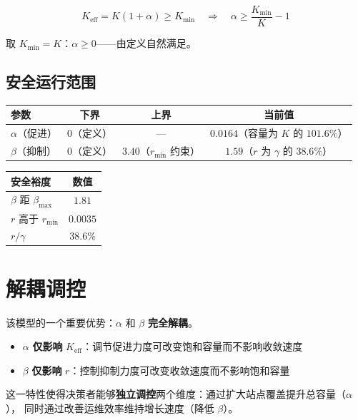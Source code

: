 \documentclass[12pt,a4paper]{article}
\begin{document}
\begin{equation}
K_{\text{eff}} = K(1+\alpha) \geq K_{\min} \quad\Rightarrow\quad
\alpha \geq \frac{K_{\min}}{K} - 1
\end{equation}

取 $K_{\min} = K$：$\alpha \geq 0$——由定义自然满足。

\subsection{安全运行范围}

\begin{center}
\begin{tabular}{lccc}
\toprule
参数 & 下界 & 上界 & 当前值 \\
\midrule
$\alpha$（促进） & $0$（定义） & — & $0.0164$（容量为 $K$ 的 $101.6\%$）\\
$\beta$（抑制） & $0$（定义） & $3.40$（$r_{\min}$ 约束） & $1.59$（$r$ 为 $\gamma$ 的 $38.6\%$）\\
\bottomrule
\end{tabular}
\end{center}

\begin{center}
\begin{tabular}{lc}
\toprule
安全裕度 & 数值 \\
\midrule
$\beta$ 距 $\beta_{\max}$ & $1.81$ \\
$r$ 高于 $r_{\min}$ & $0.0035$ \\
$r/\gamma$ & $38.6\%$ \\
\bottomrule
\end{tabular}
\end{center}

\section{解耦调控}

该模型的一个重要优势：$\alpha$ 和 $\beta$ \textbf{完全解耦}。

\begin{itemize}
  \item $\alpha$ \textbf{仅影响} $K_{\text{eff}}$：调节促进力度可改变饱和容量而不影响收敛速度
  \item $\beta$ \textbf{仅影响} $r$：控制抑制力度可改变收敛速度而不影响饱和容量
\end{itemize}

这一特性使得决策者能够\textbf{独立调控}两个维度：通过扩大站点覆盖提升总容量（$\alpha$），
同时通过改善运维效率维持增长速度（降低 $\beta$）。
\end{document}

